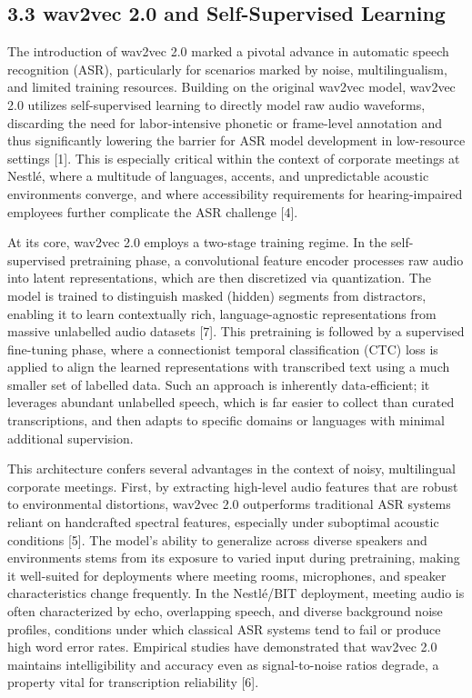 \documentclass[12pt,a4paper]{article}
\begin{document}
\subsection{3.3 wav2vec 2.0 and Self-Supervised Learning}


The introduction of wav2vec 2.0 marked a pivotal advance in automatic speech recognition (ASR), particularly for scenarios marked by noise, multilingualism, and limited training resources. Building on the original wav2vec model, wav2vec 2.0 utilizes self-supervised learning to directly model raw audio waveforms, discarding the need for labor-intensive phonetic or frame-level annotation and thus significantly lowering the barrier for ASR model development in low-resource settings [1]. This is especially critical within the context of corporate meetings at Nestlé, where a multitude of languages, accents, and unpredictable acoustic environments converge, and where accessibility requirements for hearing-impaired employees further complicate the ASR challenge [4].


At its core, wav2vec 2.0 employs a two-stage training regime. In the self-supervised pretraining phase, a convolutional feature encoder processes raw audio into latent representations, which are then discretized via quantization. The model is trained to distinguish masked (hidden) segments from distractors, enabling it to learn contextually rich, language-agnostic representations from massive unlabelled audio datasets [7]. This pretraining is followed by a supervised fine-tuning phase, where a connectionist temporal classification (CTC) loss is applied to align the learned representations with transcribed text using a much smaller set of labelled data. Such an approach is inherently data-efficient; it leverages abundant unlabelled speech, which is far easier to collect than curated transcriptions, and then adapts to specific domains or languages with minimal additional supervision.


This architecture confers several advantages in the context of noisy, multilingual corporate meetings. First, by extracting high-level audio features that are robust to environmental distortions, wav2vec 2.0 outperforms traditional ASR systems reliant on handcrafted spectral features, especially under suboptimal acoustic conditions [5]. The model’s ability to generalize across diverse speakers and environments stems from its exposure to varied input during pretraining, making it well-suited for deployments where meeting rooms, microphones, and speaker characteristics change frequently. In the Nestlé/BIT deployment, meeting audio is often characterized by echo, overlapping speech, and diverse background noise profiles, conditions under which classical ASR systems tend to fail or produce high word error rates. Empirical studies have demonstrated that wav2vec 2.0 maintains intelligibility and accuracy even as signal-to-noise ratios degrade, a property vital for transcription reliability [6].
\end{document}

